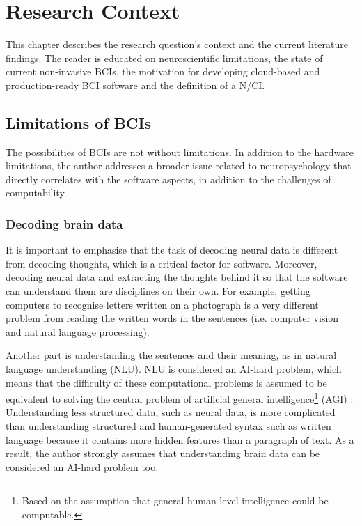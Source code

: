 \chapter{Research Context}
\graphicspath{{Chapter2/Figs/}{Chapter2/Figs/}}

This chapter describes the research question's context and the current literature findings. The reader is educated on neuroscientific limitations, the state of current non-invasive BCIs, the motivation for developing cloud-based and production-ready BCI software and the definition of a N/CI.

\section{Limitations of BCIs}
\label{chapter2-limitations-of-bcis}

The possibilities of BCIs are not without limitations. In addition to the hardware limitations, the author addresses a broader issue related to neuropsychology that directly correlates with the software aspects, in addition to the challenges of computability.

\subsection{Decoding brain data}
\label{chapter2-decoding-brain-data}

It is important to emphasise that the task of decoding neural data is different from decoding thoughts, which is a critical factor for software. Moreover, decoding neural data and extracting the thoughts behind it so that the software can understand them are disciplines on their own. For example, getting computers to recognise letters written on a photograph is a very different problem from reading the written words in the sentences (i.e. computer vision and natural language processing).

Another part is understanding the sentences and their meaning, as in natural language understanding (NLU). NLU is considered an AI-hard problem, which means that the difficulty of these computational problems is assumed to be equivalent to solving the central problem of artificial general intelligence\footnote{Based on the assumption that general human-level intelligence could be computable.} (AGI) \citep{demasi_theoretical_2010}. Understanding less structured data, such as neural data, is more complicated than understanding structured and human-generated syntax such as written language because it contains more hidden features than a paragraph of text. As a result, the author strongly assumes that understanding brain data can be considered an AI-hard problem too.

